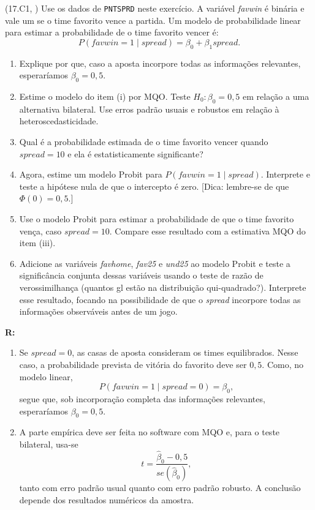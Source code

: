\documentclass[12pt,letterpaper,onecolumn]{exam}
\renewenvironment{solution}
{\par\noindent\textbf{R:}\enspace\color{blue}}
{\par\color{black}}
\begin{document}
\begin{questions}
\question\qstar (17.C1, \citep{wooldridge2016}) Use os dados de \texttt{PNTSPRD} neste exercício. A variável \textit{favwin} é binária e vale um se o time favorito vence a partida. Um modelo de probabilidade linear para estimar a probabilidade de o time favorito vencer é:
\[
P(favwin=1\mid spread)=\beta_0+\beta_1 spread.
\]
\begin{enumerate}[label=(\roman*)]
    \item Explique por que, caso a aposta incorpore todas as informações relevantes, esperaríamos \(\beta_0=0{,}5\).
    \item Estime o modelo do item (i) por MQO. Teste \(H_0:\beta_0=0{,}5\) em relação a uma alternativa bilateral. Use erros padrão usuais e robustos em relação à heteroscedasticidade.
    \item Qual é a probabilidade estimada de o time favorito vencer quando \(spread=10\) e ela é estatisticamente significante?
    \item Agora, estime um modelo Probit para \(P(favwin=1\mid spread)\). Interprete e teste a hipótese nula de que o intercepto é zero. [Dica: lembre-se de que \(\Phi(0)=0{,}5\).]
    \item Use o modelo Probit para estimar a probabilidade de que o time favorito vença, caso \(spread=10\). Compare esse resultado com a estimativa MQO do item (iii).
    \item Adicione as variáveis \textit{favhome}, \textit{fav25} e \textit{und25} ao modelo Probit e teste a significância conjunta dessas variáveis usando o teste de razão de verossimilhança (quantos gl estão na distribuição qui-quadrado?). Interprete esse resultado, focando na possibilidade de que o \textit{spread} incorpore todas as informações observáveis antes de um jogo.
\end{enumerate}

\begin{solution}
\begin{enumerate}[label=(\roman*)]
    \item Se \(spread=0\), as casas de aposta consideram os times equilibrados. Nesse caso, a probabilidade prevista de vitória do favorito deve ser \(0{,}5\). Como, no modelo linear,
    \[
    P(favwin=1\mid spread=0)=\beta_0,
    \]
    segue que, sob incorporação completa das informações relevantes, esperaríamos \(\beta_0=0{,}5\).

    \item A parte empírica deve ser feita no software com MQO e, para o teste bilateral, usa-se
    \[
    t=\frac{\hat{\beta}_0-0{,}5}{se(\hat{\beta}_0)},
    \]
    tanto com erro padrão usual quanto com erro padrão robusto. A conclusão depende dos resultados numéricos da amostra.


\end{enumerate}
\end{solution}
\end{questions}
\end{document}
